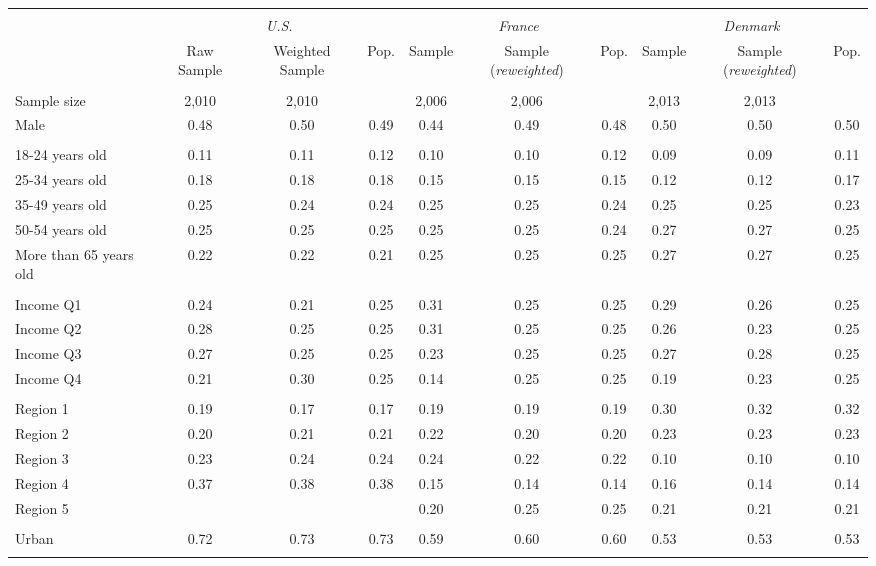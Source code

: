 \begin{tabular}{lccccccccc}
\toprule
\hline \\[-1.8ex]
\multicolumn{1}{c}{\em{ }} & \multicolumn{3}{c}{\em{U.S.}} & \multicolumn{3}{c}{\em{France}} & \multicolumn{3}{c}{\em{Denmark}}\\
\cmidrule(l{3pt}r{3pt}){2-4} \cmidrule(l{3pt}r{3pt}){5-7} \cmidrule(l{3pt}r{3pt}){8-10}
\noalign{\smallskip}  & Raw Sample & Weighted Sample & Pop. & Sample & Sample (\textit{reweighted}) & Pop. & Sample & Sample (\textit{reweighted}) & Pop. \\
\hline \\[-1.8ex] 
Sample size & 2,010 & 2,010 & & 2,006 & 2,006 &  & 2,013 & 2,013 & \\
\noalign{\smallskip}\hline \noalign{\smallskip}Male & 0.48 & 0.50 & 0.49 & 0.44 & 0.49 & 0.48 & 0.50 & 0.50 & 0.50\\ 
\\
18-24 years old & 0.11 & 0.11 & 0.12 & 0.10 & 0.10 & 0.12 & 0.09 & 0.09 & 0.11\\
25-34 years old & 0.18 & 0.18 & 0.18 & 0.15 & 0.15 & 0.15 & 0.12 & 0.12 & 0.17\\
35-49 years old & 0.25 & 0.24 & 0.24 & 0.25 & 0.25 & 0.24 & 0.25 & 0.25 & 0.23\\
50-54 years old & 0.25 & 0.25 & 0.25 & 0.25 & 0.25 & 0.24 & 0.27 & 0.27 & 0.25\\
More than 65 years old & 0.22 & 0.22 & 0.21 & 0.25 & 0.25 & 0.25 & 0.27 & 0.27 & 0.25\\ 
\\
Income Q1 & 0.24 & 0.21 & 0.25 & 0.31 & 0.25 & 0.25 & 0.29 & 0.26 & 0.25\\
Income Q2 & 0.28 & 0.25 & 0.25 & 0.31 & 0.25 & 0.25 & 0.26 & 0.23 & 0.25\\
Income Q3 & 0.27 & 0.25 & 0.25 & 0.23 & 0.25 & 0.25 & 0.27 & 0.28 & 0.25\\
Income Q4 & 0.21 & 0.30 & 0.25 & 0.14 & 0.25 & 0.25 & 0.19 & 0.23 & 0.25\\
\\
Region 1 & 0.19 & 0.17 & 0.17 & 0.19 & 0.19 & 0.19 & 0.30 & 0.32 & 0.32\\
Region 2 & 0.20 & 0.21 & 0.21 & 0.22 & 0.20 & 0.20 & 0.23 & 0.23 & 0.23\\
Region 3 & 0.23 & 0.24 & 0.24 & 0.24 & 0.22 & 0.22 & 0.10 & 0.10 & 0.10\\
Region 4 & 0.37 & 0.38 & 0.38 & 0.15 & 0.14 & 0.14 & 0.16 & 0.14 & 0.14\\
Region 5 & &  &  & 0.20 & 0.25 & 0.25 & 0.21 & 0.21 & 0.21\\
\\
Urban & 0.72 & 0.73 & 0.73 & 0.59 & 0.60 & 0.60 & 0.53 & 0.53 & 0.53\\
\\
\bottomrule
\end{tabular}